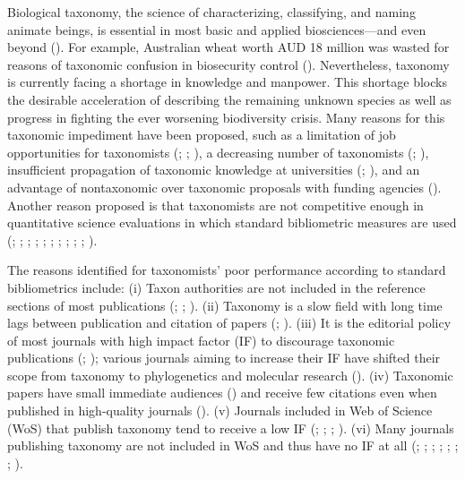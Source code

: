 \documentclass[webpdf,PV,mynatbib,surname,CE,MSC]{SYS-PV}
\begin{document}
Biological taxonomy, the science of characterizing, classifying, and naming animate beings, is
essential in most basic and applied biosciences---and even beyond (\citealt{12Bortolus2008}). For
example, Australian wheat worth AUD 18 million was wasted for reasons of taxonomic confusion in
biosecurity control (\citealt{13Boykin2011}). Nevertheless, taxonomy is currently facing a
shortage in knowledge and manpower. This shortage blocks the desirable acceleration of describing
the remaining unknown species as well as progress in fighting the ever worsening biodiversity
crisis. Many reasons for this taxonomic impediment have been proposed, such as a limitation of job
opportunities for taxonomists (\citealt{3Agnarsson2007}; \citealt{20Ebach2011};
\citealt{33Lester2014}), a decreasing number of taxonomists (\citealt{25Gaston1992};
\citealt{35Mora2011}), insufficient propagation of taxonomic knowledge at universities
(\citealt{48Swiss2007}; \citealt{7Bilton2014}), and an advantage of nontaxonomic over taxonomic
proposals with funding agencies (\citealt{48Swiss2007}). Another reason proposed is that
taxonomists are not competitive enough in quantitative science evaluations in which standard
bibliometric measures are used (\citealt{31Krell2000}; \citealt{51Valdecasas2000};
\citealt{32Krell2002}; \citealt{20Ebach2011}; \citealt{34McDade2011}; \citealt{50Valdecasas2011};
\citealt{53Venu2011}; \citealt{6Benitez2014}; \citealt{7Bilton2014}; \citealt{19De2014};
\citealt{39Pyke2014}).

The reasons identified for taxonomists' poor performance according to standard bibliometrics
include: (i) Taxon authorities are not included in the reference sections of most publications
(\citealt{55Werner2006}; \citealt{47Sundberg2009}; \citealt{8Bininda-Emonds2011}). (ii) Taxonomy
is a slow field with long time lags between publication and citation of papers
(\citealt{32Krell2002}; \citealt{53Venu2011}). (iii) It is the editorial policy of most journals
with high impact factor (IF) to discourage taxonomic publications (\citealt{3Agnarsson2007};
\citealt{20Ebach2011}); various journals aiming to increase their IF have shifted their scope from
taxonomy to phylogenetics and molecular research (\citealt{43Shashank2014}). (iv) Taxonomic papers
have small immediate audiences (\citealt{20Ebach2011}) and receive few citations even when
published in high-quality journals (\citealt{51Valdecasas2000}). (v) Journals included in Web of
Science (WoS) that publish taxonomy tend to receive a low IF (\citealt{55Werner2006};
\citealt{53Venu2011}; \citealt{7Bilton2014}; \citealt{43Shashank2014}). (vi) Many journals
publishing taxonomy are not included in WoS and thus have no IF at all (\citealt{31Krell2000};
\citealt{9Boero2001}; \citealt{32Krell2002}; \citealt{48Swiss2007}; \citealt{10Boero2010};
\citealt{34McDade2011}; \citealt{6Benitez2014}; \citealt{43Shashank2014}).
\end{document}
